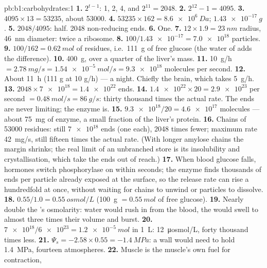 \begin{solution}{pb:b1:carbohydrates:1}
\textbf{1.} $2^{t-1}$: 1, 2, 4, and $2^{11} = 2048$.
\textbf{2.} $2^{12} - 1 = 4095$.
\textbf{3.} $4095\times 13 = \num{53235}$, about \num{53000}.
\textbf{4.} $\num{53235}\times 162 = \qty{8.6e6}{Da}$;
$\qty{1.43e-17}{g}$.
\textbf{5.} $2048/4095$: half. \num{2048} non-reducing ends.
\textbf{6.} One.
\textbf{7.} $12\times 1.9 = \qty{23}{nm}$ radius, \qty{46}{nm}
diameter: twice a ribosome.
\textbf{8.} $100/\num{1.43e-17} = \num{7.0e18}$ particles.
\textbf{9.} $100/162 = \qty{0.62}{mol}$ of residues, i.e.\ \qty{111}{g}
of free glucose (the water of  adds the difference).
\textbf{10.} \qty{400}{g}, over a quarter of the liver's mass.
\textbf{11.} \qty{10}{g/h} $= \qty{2.78}{mg/s} = \qty{1.54e-5}{mol/s} =
\num{9.3e18}$ molecules per second.
\textbf{12.} About \qty{11}{h} (111 g at 10 g/h) --- a night. Chiefly
the brain, which takes \qty{5}{g/h}.
\textbf{13.} $2048\times\num{7e18} = \num{1.4e22}$ ends.
\textbf{14.} $\num{1.4e22}\times 20 = \num{2.9e23}$ per second $=
\qty{0.48}{mol/s} = \qty{86}{g/s}$: thirty thousand times the actual
rate. The ends are never limiting; the enzyme is.
\textbf{15.} $\num{9.3e18}/20 = \num{4.6e17}$ molecules --- about
\qty{75}{mg} of enzyme, a small fraction of the liver's protein.
\textbf{16.} Chains of \num{53000} residues: still $\num{7e18}$ ends
(one each), \num{2048} times fewer; maximum rate \qty{42}{mg/s}, still
fifteen times the actual rate. (With longer amylose chains the margin
shrinks; the real limit of an unbranched store is its insolubility and
crystallisation, which take the ends out of reach.)
\textbf{17.} When blood glucose falls, hormones switch phosphorylase
on within seconds; the enzyme finds thousands of ends per particle
already exposed at the surface, so the release rate can rise a
hundredfold at once, without waiting for chains to unwind or
particles to dissolve.
\textbf{18.} $0.55/1.0 = \qty{0.55}{osmol/L}$ (\qty{100}{g}
$= \qty{0.55}{mol}$ of free glucose).
\textbf{19.} Nearly double the 's osmolarity: water would rush
in from the blood, the  would swell to almost three times their
volume and burst.
\textbf{20.} $\num{7e18}/\num{6e23} = \qty{1.2e-5}{mol}$ in \qty{1}{L}:
\qty{12}{\micro osmol/L}, forty thousand times less.
\textbf{21.} $\Psi_s = -2.58\times 0.55 = \qty{-1.4}{MPa}$: a wall
would need to hold \qty{1.4}{MPa}, fourteen atmospheres.
\textbf{22.} Muscle  is the muscle's own fuel for contraction,

\end{solution}
